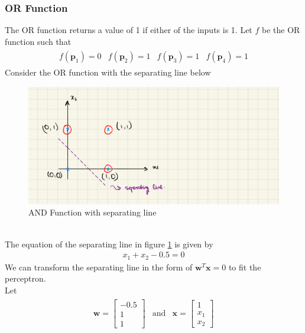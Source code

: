 \subsubsection*{OR Function}
The OR function returns a value of 1 if either of the inputs is 1. Let $f$ be the OR function such that
\begin{align}
\begin{matrix}
  \nonumber
  f(\textbf{p}_1) = 0 & f(\textbf{p}_2) = 1 & f(\textbf{p}_3) = 1 & f(\textbf{p}_4) = 1
\end{matrix}  
\end{align}
Consider the OR function with the separating line below
\begin{figure}[ht]
  \centering
  \includegraphics[scale=0.15]{CHAPTER_2/c2_fig_OR_function.jpeg}
  \caption{AND Function with separating line}
  \label{OR_function}
\end{figure}\\
The equation of the separating line in figure \ref{OR_function} is given by
\begin{align}
  x_1 + x_2 - 0.5 = 0
\end{align}
We can transform the separating line in the form of $\textbf{w}^T\textbf{x} = 0$ to fit the perceptron.\\
Let 
\begin{align}
  \begin{matrix}
    \textbf{w} = \begin{bmatrix}
      -0.5 \\
      1 \\
      1
    \end{bmatrix} & \text{and} & \textbf{x} = \begin{bmatrix}
      1 \\
      x_1 \\
      x_2
    \end{bmatrix}
  \end{matrix}
\end{align}
